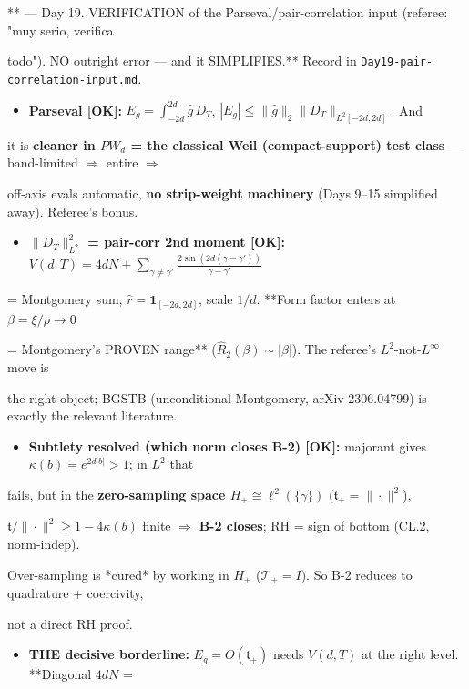 \documentclass[10pt]{article}
\begin{document}
** --- Day 19. VERIFICATION of the Parseval/pair-correlation input (referee: "muy serio, verifica\par
todo"). NO outright error --- and it SIMPLIFIES.** Record in \texttt{Day19-pair-correlation-input.md}.\par
\begin{itemize}
\item \textbf{Parseval [OK]:} $E_g=\int_{-2d}^{2d}\widehat g\,D_T$, $|E_g|\le\|\widehat g\|_2\|D_T\|_{L^2[-2d,2d]}$. And
\end{itemize}
  it is \textbf{cleaner in $PW_d$ = the classical Weil (compact-support) test class} --- band-limited \ensuremath{\Rightarrow} entire \ensuremath{\Rightarrow}\par
  off-axis evals automatic, \textbf{no strip-weight machinery} (Days 9--15 simplified away). Referee's bonus.\par
\begin{itemize}
\item \textbf{$\|D_T\|^2_{L^2}$ = pair-corr 2nd moment [OK]:} $V(d,T)=4dN+\sum_{\gamma\ne\gamma'}\frac{2\sin(2d(\gamma-\gamma'))}{\gamma-\gamma'}$
\end{itemize}
  = Montgomery sum, $\widehat r=\mathbf 1_{[-2d,2d]}$, scale $1/d$. **Form factor enters at $\beta=\xi/\rho\to0$\par
  = Montgomery's PROVEN range** ($\widehat R_2(\beta)\sim|\beta|$). The referee's $L^2$-not-$L^\infty$ move is\par
  the right object; BGSTB (unconditional Montgomery, arXiv 2306.04799) is exactly the relevant literature.\par
\begin{itemize}
\item \textbf{Subtlety resolved (which norm closes B-2) [OK]:} majorant gives $\kappa(b)=e^{2d|b|}>1$; in $L^2$ that
\end{itemize}
  fails, but in the \textbf{zero-sampling space $H_+\cong\ell^2(\{\gamma\})$} ($\mathfrak t_+=\|\cdot\|^2$),\par
  $\mathfrak t/\|\cdot\|^2\ge1-4\kappa(b)$ finite \ensuremath{\Rightarrow} \textbf{B-2 closes}; RH = sign of bottom (CL.2, norm-indep).\par
  Over-sampling is *cured* by working in $H_+$ ($\mathcal T_+=I$). So B-2 reduces to quadrature + coercivity,\par
  not a direct RH proof.\par
\begin{itemize}
\item \textbf{THE decisive borderline:} $E_g=O(\mathfrak t_+)$ needs $V(d,T)$ at the right level. **Diagonal $4dN$ =
\end{itemize}
\end{document}
